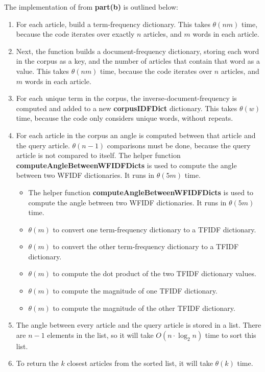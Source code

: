\documentclass[12pt,twoside]{article}
\begin{document}
\begin{problems}
\begin{problemparts}
The implementation of {\bf \functionb} from {\bf part(b)} is outlined below:
\begin{enumerate}
	\item For each article, build a term-frequency dictionary. This takes $\theta(nm)$ time, because the code iterates over exactly $n$ articles, and $m$ words in each article.
	\item Next, the function builds a document-frequency dictionary, storing each word in the corpus as a key, and the number of articles that contain that word as a value. This takes $\theta(nm)$ time, because the code iterates over $n$ articles, and $m$ words in each article.
	\item For each {\textit unique} term in the corpus, the inverse-document-frequency is computed and added to a new {\bf corpusIDFDict} dictionary. This takes $\theta(w)$ time, because the code only considers unique words, without repeats.
	\item For each article in the corpus an angle is computed between that article and the query article. $\theta(n-1)$ comparisons must be done, because the query article is not compared to itself. The helper function {\bf computeAngleBetweenWFIDFDicts} is used to compute the angle between two WFIDF dictionaries. It runs in $\theta(5m)$ time.
		\begin{itemize}
			\item The helper function {\bf computeAngleBetweenWFIDFDicts} is used to compute the angle between two WFIDF dictionaries. It runs in $\theta(5m)$ time.
			\item $\theta(m)$ to convert one term-frequency dictionary to a TFIDF dictionary.
			\item $\theta(m)$ to convert the other term-frequency dictionary to a TFIDF dictionary.
			\item $\theta(m)$ to compute the dot product of the two TFIDF dictionary values.
			\item $\theta(m)$ to compute the magnitude of one TFIDF dictionary.
			\item $\theta(m)$ to compute the magnitude of the other TFIDF dictionary.
		\end{itemize}
	\item The angle between every article and the query article is stored in a list. There are $n-1$ elements in the list, so it will take $O(n \cdot \log_2n)$ time to sort this list.
	\item To return the $k$ closest articles from the sorted list, it will take $\theta(k)$ time.
\end{enumerate}


\end{problemparts}
\end{problems}
\end{document}
